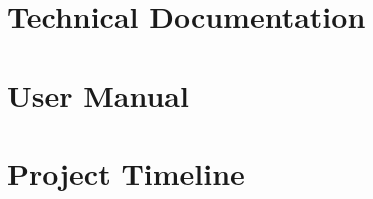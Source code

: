 \appendix
\renewcommand{\appendixname}{Appendix}

\chapter{Technical Documentation}

\chapter{User Manual}

\chapter{Project Timeline}

\cleardoublepage
\renewcommand{\bibname}{Bibliography}
